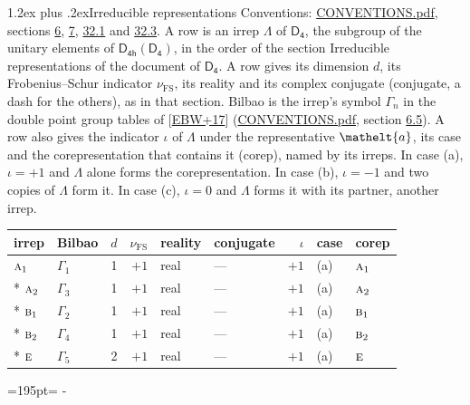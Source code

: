 \documentclass[10pt,a4paper]{article}
\makeatletter
\renewcommand\section{\@startsection{section}{1}{\z@}{-3ex plus -1ex minus -.2ex}%
  {1.2ex plus .2ex}{\normalfont\large\sffamily\bfseries\color{parttitle}}}
\newcommand{\needspace}[1]{\par\penalty-100\begingroup\dimen0=#1\relax\dimen2=\pagegoal
  \advance\dimen2-\pagetotal\ifdim\dimen0>\dimen2\relax\ifdim\dimen2>0pt\vfil\break\fi\fi
  \endgroup}
\numberwithin{equation}{section}
\newcommand{\eltfont}[1]{{\let\sigma\eltsigma\mathelt{#1}}}
\newcommand{\grp}[1]{\mathsf{#1}}
\newcommand{\irr}[1]{\text{\normalfont\scshape #1}}
\newcommand{\elt}[1]{\eltfont{#1}}
\newcommand{\fsind}{\nu_{\mathrm{FS}}}
\makeatother
\begin{document}
\section{Irreducible representations}\label{s:irreps}
Conventions: \href{../../CONVENTIONS.pdf}{CONVENTIONS.pdf}, sections \href{../../../rotation/CONVENTIONS.pdf\#conv.6}{6}, \href{../../../rotation/CONVENTIONS.pdf\#conv.7}{7}, \href{../../CONVENTIONS.pdf\#conv.32.1}{32.1} and \href{../../CONVENTIONS.pdf\#conv.32.3}{32.3}.
\leavevmode\label{n:irrep.Delta}A row is an irrep $\Lambda$ of $\grp{D_{4}}$, the subgroup of the unitary elements of $\grp{D_{4h}}(\grp{D_{4}})$, in the order of the section Irreducible representations of the document of \href{../../../rotation/data/pdf/D4.pdf}{$\grp{D_{4}}$}. \label{n:index.dimension}\label{n:index.frobenius}\label{n:head.irrep}\label{n:head.reality}\label{n:head.conjugate}A row gives its dimension $d$, its Frobenius--Schur indicator $\fsind$, its reality and its complex conjugate (conjugate, a dash for the others), as in that section. \label{n:head.bilbao}\label{n:irrep.alias.gamma}Bilbao is the irrep's symbol $\Gamma_n$ in the double point group tables of [\href{../../../REFERENCES.pdf\#ref.EBW+17}{EBW+17}] (\href{../../CONVENTIONS.pdf}{CONVENTIONS.pdf}, section \href{../../../rotation/CONVENTIONS.pdf\#conv.6.5}{6.5}). \label{n:head.case.corep}\label{n:head.corep}A row also gives the indicator $\iota$ of $\Lambda$ under the representative $\elt{a}$, its case and the corepresentation that contains it (corep), named by its irreps. In case (a), $\iota = +1$ and $\Lambda$ alone forms the corepresentation. In case (b), $\iota = -1$ and two copies of $\Lambda$ form it. In case (c), $\iota = 0$ and $\Lambda$ forms it with its partner, another irrep.
\setlength{\emergencystretch}{2em}\par\setlength{\emergencystretch}{0pt}
{\small\renewcommand{\arraystretch}{1.25}\setlength{\tabcolsep}{4pt}\begin{longtable}{@{}llrrllrll@{}}\toprule
irrep & Bilbao & $d$ & $\fsind$ & reality & conjugate & $\iota$ & case & corep\\\midrule\endhead
\bottomrule\endfoot\endlastfoot
$\irr{a}_{1}$ & $\Gamma_{1}$ & 1 & $+1$ & real & --- & $+1$ & (a) & $\irr{a}_{1}$\\*
$\irr{a}_{2}$ & $\Gamma_{3}$ & 1 & $+1$ & real & --- & $+1$ & (a) & $\irr{a}_{2}$\\*
$\irr{b}_{1}$ & $\Gamma_{2}$ & 1 & $+1$ & real & --- & $+1$ & (a) & $\irr{b}_{1}$\\*
$\irr{b}_{2}$ & $\Gamma_{4}$ & 1 & $+1$ & real & --- & $+1$ & (a) & $\irr{b}_{2}$\\*
$\irr{e}$ & $\Gamma_{5}$ & 2 & $+1$ & real & --- & $+1$ & (a) & $\irr{e}$\\
\bottomrule\end{longtable}}
\needspace{195pt}
\end{document}

